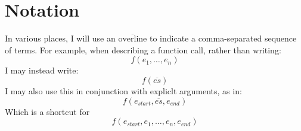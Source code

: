 \section{Notation}

In various places, I will use an \(\overline{\text{overline}}\) to
indicate a comma-separated sequence of terms.  For example, when
describing a function call, rather than writing:
\[
f(e_{1},\ldots,e_{n})
\]
I may instead write:
\[
f(\overline{es})
\]
I may also use this in conjunction with expliclt arguments, as in:
\[
f(e_{start},\overline{es},e_{end})
\]
Which is a shortcut for
\[
f(e_{start},e_{1},\ldots,e_{n},e_{end})
\]


